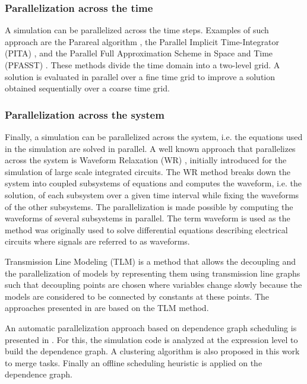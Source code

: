 \subsubsection{Parallelization across the time}

A simulation can be parallelized across the time steps. Examples of such approach are the Parareal algorithm \cite{lions:2001}, the Parallel Implicit Time-Integrator (PITA) \cite{farhat:2003}, and the Parallel Full Approximation Scheme in Space and Time (PFASST) \cite{emmett:2012}. These methods divide the time domain into a two-level grid. A solution is evaluated in parallel over a fine time grid to improve a solution obtained sequentially over a coarse time grid.
\subsubsection{Parallelization across the system}

Finally, a simulation can be parallelized across the system, i.e. the equations used in the simulation are solved in parallel. A well known approach that parallelizes across the system is Waveform Relaxation (WR) \cite{lelarasmee:1982}, initially introduced for the simulation of large scale integrated circuits. The WR method breaks down the system into coupled subsystems of equations and computes the waveform, i.e. the solution, of each subsystem over a given time interval while fixing the waveforms of the other subsystems. The parallelization is made possible by computing the waveforms of several subsystems in parallel. The term waveform is used as the method was originally used to solve differential equations describing electrical circuits where signals are referred to as waveforms. 

Transmission Line Modeling (TLM) \cite{hui:1990} is a method that allows the decoupling and the parallelization of models by representing them using transmission line graphs such that decoupling points are chosen where variables change slowly because the models are considered to be connected by constants at these points. The approaches presented in \cite{sjolund:2010,braun:2012} are based on the TLM method. 

An automatic parallelization approach based on dependence graph scheduling is presented in \cite{aronsson:2006}. For this, the simulation code is analyzed at the expression level to build the dependence graph. A clustering algorithm is also proposed in this work to merge tasks. Finally an offline scheduling heuristic is applied on the dependence graph.

